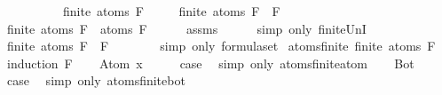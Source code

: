 \begin{isabellebody}
\ \ \ \ \ \ \ \ \ \ {\isachardoublequoteopen}finite\ {\isacharparenleft}atoms\ F{}{\isacharparenright}{\isachardoublequoteclose}\isanewline
\ \ \ \ \ {\isachardoublequoteopen}finite\ {\isacharparenleft}atoms\ {\isacharparenleft}F{}\ \isactrlbold {\isasymrightarrow}\ F{}{\isacharparenright}{\isacharparenright}{\isachardoublequoteclose}\isanewline
%
\isadelimproof
%
\endisadelimproof
%
\isatagproof
{}\isamarkupfalse%
\ {\isacharminus}\isanewline
\ \ \isamarkupfalse%
\ {\isachardoublequoteopen}finite\ {\isacharparenleft}atoms\ F{}\ {\isasymunion}\ atoms\ F{}{\isacharparenright}{\isachardoublequoteclose}\isanewline
\ \ \ \ \isamarkupfalse%
\ assms\isanewline
\ \ \ \ \isamarkupfalse%
\ {\isacharparenleft}simp\ only{\isacharcolon}\ finite{\isacharunderscore}UnI{\isacharparenright}\isanewline
\ \ \isamarkupfalse%
\ \isamarkupfalse%
\ {\isachardoublequoteopen}finite\ {\isacharparenleft}atoms\ {\isacharparenleft}F{}\ \isactrlbold {\isasymrightarrow}\ F{}{\isacharparenright}{\isacharparenright}{\isachardoublequoteclose}\ \ \isanewline
\ \ \ \ \isamarkupfalse%
\ {\isacharparenleft}simp\ only{\isacharcolon}\ formula{\isachardot}set{\isacharparenleft}{}{\isacharparenright}{\isacharparenright}\isanewline
{}\isamarkupfalse%
%
\endisatagproof
{\isafoldproof}%
%
\isadelimproof
\isanewline
%
\endisadelimproof
\isanewline
{}\isamarkupfalse%
\ atoms{\isacharunderscore}finite{\isacharcolon}\ {\isachardoublequoteopen}finite\ {\isacharparenleft}atoms\ F{\isacharparenright}{\isachardoublequoteclose}\isanewline
%
\isadelimproof
%
\endisadelimproof
%
\isatagproof
{}\isamarkupfalse%
\ {\isacharparenleft}induction\ F{\isacharparenright}\isanewline
\ \ \isamarkupfalse%
\ {\isacharparenleft}Atom\ x{\isacharparenright}\isanewline
\ \ \isamarkupfalse%
\ \isamarkupfalse%
\ {\isacharquery}case\ \isamarkupfalse%
\ {\isacharparenleft}simp\ only{\isacharcolon}\ atoms{\isacharunderscore}finite{\isacharunderscore}atom{\isacharparenright}\isanewline
{}\isamarkupfalse%
\isanewline
\ \ \isamarkupfalse%
\ Bot\isanewline
\ \ \isamarkupfalse%
\ \isamarkupfalse%
\ {\isacharquery}case\ \isamarkupfalse%
\ {\isacharparenleft}simp\ only{\isacharcolon}\ atoms{\isacharunderscore}finite{\isacharunderscore}bot{\isacharparenright}\isanewline

\end{isabellebody}
